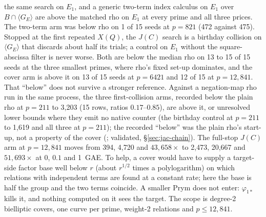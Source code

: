 the same search on $E_1$, and a generic two-term index calculus on $E_1$ over
$B\cap\langle G_E\rangle$ are above the matched rho on $E_1$ at every prime and
all three prices. The two-term arm was below rho on 1 of 15 seeds at
$p=821$ (472 against 475). Stopped at the first repeated $X(Q)$, the $J(C)$
search is a birthday collision on $\langle G_E\rangle$ that discards about
half its trials; a control on $E_1$ without the square-abscissa filter is
never worse. Both are below the median rho on 13 to 15 of 15 seeds at the
three smallest primes, where rho's fixed set-up dominates, and the cover arm
is above it on 13 of 15 seeds at $p=6421$ and 12 of 15 at $p=12{,}841$.
That ``below'' does not survive a stronger reference. Against a negation-map
rho run in the same process, the three first-collision arms, recorded below
the plain rho at $p=211$ to 3{,}203 (15 rows, ratios $0.17$--$0.85$), are
above it, or unresolved lower bounds where they emit no native counter (the
birthday control at $p=211$ to 1{,}619 and all three at $p=211$); the recorded
``below'' was the plain rho's start-up, not a property of the cover
(; validated,
\S\ref{sec:jac-chain}). The full-stop $J(C)$ arm at $p=12{,}841$ moves from
394, 4{,}720 and $43{,}658\times$ to 2{,}473, 20{,}667 and $51{,}693\times$ at 0,
$0.1$ and 1~GAE. To help, a cover would have to supply a target-side
factor base well below $r$ (about $r^{1/2}$ times a polylogarithm) on which
relations with independent terms are found at a constant rate; here the
base is half the group and the two terms coincide. A smaller Prym does not
enter: $\varphi_{1*}$ kills it, and nothing computed on it sees the target.
The scope is degree-2 bielliptic covers, one curve per prime, weight-2
relations and $p\le12{,}841$.

